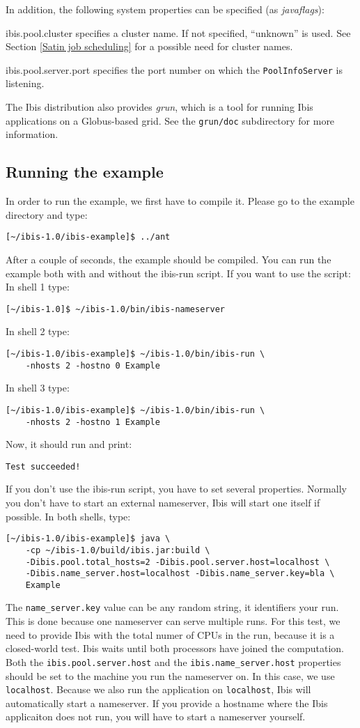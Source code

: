 \documentclass[10pt]{article}
\newcommand{\mysubsection}[1]{\subsection{#1}\label{#1}}
\begin{document}
In addition, the following system properties can be specified
(as \emph{javaflags}):
\begin{description}
\item{ibis.pool.cluster}
specifies a cluster name. If not specified,
``unknown'' is used.
See Section \ref{Satin job scheduling} for a possible need for cluster
names.
\item{ibis.pool.server.port}
specifies the port number on which the
\texttt{PoolInfoServer} is listening.
\end{description}

The Ibis distribution also provides \emph{grun}, which is a tool for
running Ibis applications on a Globus-based grid. See the
\texttt{grun/doc} subdirectory for more information.

\mysubsection{Running the example}
In order to run the example, we first have to compile it.
Please go to the example directory and type:
\noindent
\begin{verbatim}
[~/ibis-1.0/ibis-example]$ ../ant
\end{verbatim}
\noindent
After a couple of seconds, the example should be compiled.
You can run the example both with and without the ibis-run script.
If you want to use the script:
In shell 1 type:
\begin{verbatim}
[~/ibis-1.0]$ ~/ibis-1.0/bin/ibis-nameserver 
\end{verbatim}
\noindent
In shell 2 type:
\begin{verbatim}
[~/ibis-1.0/ibis-example]$ ~/ibis-1.0/bin/ibis-run \
    -nhosts 2 -hostno 0 Example
\end{verbatim}
\noindent
In shell 3 type:
\begin{verbatim}
[~/ibis-1.0/ibis-example]$ ~/ibis-1.0/bin/ibis-run \
    -nhosts 2 -hostno 1 Example
\end{verbatim}
\noindent
Now, it should run and print:
\begin{verbatim}
Test succeeded!
\end{verbatim}
\noindent
If you don't use the ibis-run script, you have to set several properties.
Normally you don't have to start an external nameserver, Ibis will
start one itself if possible.
In both shells, type:
\begin{verbatim}
[~/ibis-1.0/ibis-example]$ java \
    -cp ~/ibis-1.0/build/ibis.jar:build \
    -Dibis.pool.total_hosts=2 -Dibis.pool.server.host=localhost \
    -Dibis.name_server.host=localhost -Dibis.name_server.key=bla \
    Example
\end{verbatim}
\noindent
The \texttt{name\_server.key} value can be any random string, it identifiers
your run. This is done because one nameserver can serve multiple
runs. For this test, we need to provide Ibis with the total numer of
CPUs in the run, because it is a closed-world test. Ibis waits until
both processors have joined the computation. Both the
\texttt{ibis.pool.server.host} and the \texttt{ibis.name\_server.host} properties should
be set to the machine you run the nameserver on.  In this case, we use
\texttt{localhost}. Because we also run the application on \texttt{localhost}, Ibis will
automatically start a nameserver. If you provide a hostname where the
Ibis applicaiton does not run, you will have to start a nameserver
yourself.
\end{document}
